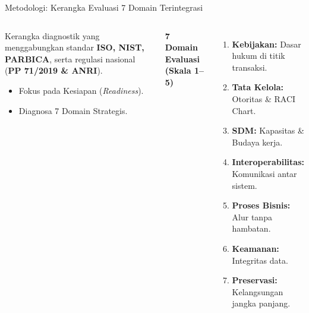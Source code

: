 \documentclass[aspectratio=169,11pt]{beamer}
\begin{document}
\begin{frame}{Metodologi: Kerangka Evaluasi 7 Domain Terintegrasi}
    \begin{columns}
        \begin{premiumbox}
            \small
            Kerangka diagnostik yang menggabungkan standar \textbf{ISO, NIST, PARBICA}, serta regulasi nasional (\textbf{PP 71/2019 \& ANRI}).
            \begin{itemize}
                \item Fokus pada Kesiapan (\textit{Readiness}).
                \item Diagnosa 7 Domain Strategis.
            \end{itemize}
        \end{premiumbox}
        
        \textbf{7 Domain Evaluasi (Skala 1--5)}
        \vspace{0.2cm}
        \tiny
        \begin{enumerate}
            \item \textbf{Kebijakan:} Dasar hukum di titik transaksi.
            \item \textbf{Tata Kelola:} Otoritas \& RACI Chart.
            \item \textbf{SDM:} Kapasitas \& Budaya kerja.
            \item \textbf{Interoperabilitas:} Komunikasi antar sistem.
            \item \textbf{Proses Bisnis:} Alur tanpa hambatan.
            \item \textbf{Keamanan:} Integritas data.
            \item \textbf{Preservasi:} Kelangsungan jangka panjang.
        \end{enumerate}
    \end{columns}
\end{frame}
\end{document}
